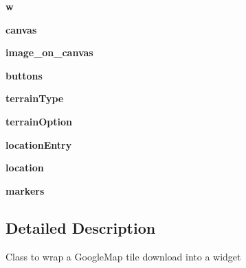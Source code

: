 \begin{DoxyCompactItemize}
{\bfseries w}
\item 
\mbox{\label{class_python_01_g_u_i_1_1appjar_1_1_google_map_af7ed1fc245bc2a6efe9cda3b38e90e9f}} 
{\bfseries canvas}
\item 
\mbox{\label{class_python_01_g_u_i_1_1appjar_1_1_google_map_aaf92b77f3742bfdb753357e8bc564d40}} 
{\bfseries image\+\_\+on\+\_\+canvas}
\item 
\mbox{\label{class_python_01_g_u_i_1_1appjar_1_1_google_map_a9662dfada69d8f31ef83cdb2c27f74ce}} 
{\bfseries buttons}
\item 
\mbox{\label{class_python_01_g_u_i_1_1appjar_1_1_google_map_ab0460a26f6ed4e99a63b0e4736ddf26a}} 
{\bfseries terrain\+Type}
\item 
\mbox{\label{class_python_01_g_u_i_1_1appjar_1_1_google_map_a0598311871d80579aed5abd2c6e5ec78}} 
{\bfseries terrain\+Option}
\item 
\mbox{\label{class_python_01_g_u_i_1_1appjar_1_1_google_map_a98818daaaa01439f28521ba401a46178}} 
{\bfseries location\+Entry}
\item 
\mbox{\label{class_python_01_g_u_i_1_1appjar_1_1_google_map_ad24d10e08aed104307b56ea927f36360}} 
{\bfseries location}
\item 
\mbox{\label{class_python_01_g_u_i_1_1appjar_1_1_google_map_afabaf5a02df7636a3834de79d29ef546}} 
{\bfseries markers}
\end{DoxyCompactItemize}


\subsection{Detailed Description}
\begin{DoxyVerb}Class to wrap a GoogleMap tile download into a widget\end{DoxyVerb}
 

